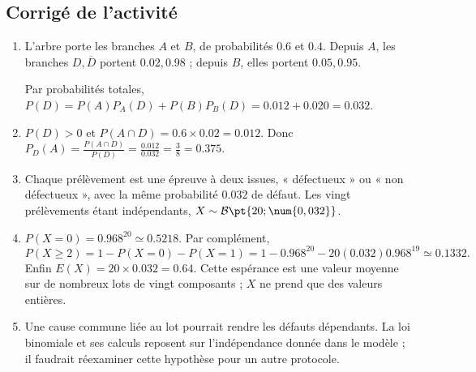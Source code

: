 \subsection{Corrigé de l'activité}\begin{enumerate}
\item L'arbre porte les branches $A$ et $B$, de probabilités $\num{0,6}$ et $\num{0,4}$. Depuis $A$, les branches $D,\overline D$ portent $\num{0,02},\num{0,98}$ ; depuis $B$, elles portent $\num{0,05},\num{0,95}$.
\begin{center}\end{center}
Par probabilités totales, $P(D)=P(A)P_A(D)+P(B)P_B(D)=\num{0,012}+\num{0,020}=\num{0,032}$.
\item $P(D)>0$ et $P(A\cap D)=\num{0,6}\times\num{0,02}=\num{0,012}$. Donc $P_D(A)=\frac{P(A\cap D)}{P(D)}=\frac{\num{0,012}}{\num{0,032}}=\frac{3}{8}=\num{0,375}$.
\item Chaque prélèvement est une épreuve à deux issues, « défectueux » ou « non défectueux », avec la même probabilité $\num{0,032}$ de défaut. Les vingt prélèvements étant indépendants, $X\sim\mathcal B\pt{20;\num{0,032}}$.
\item $P(X=0)=\num{0,968}^{20}\simeq\num{0,5218}$. Par complément,
\[P(X\ge2)=1-P(X=0)-P(X=1)=1-\num{0,968}^{20}-20(\num{0,032})\num{0,968}^{19}\simeq\num{0,1332}.\]
Enfin $E(X)=20\times\num{0,032}=\num{0,64}$. Cette espérance est une valeur moyenne sur de nombreux lots de vingt composants ; $X$ ne prend que des valeurs entières.
\item Une cause commune liée au lot pourrait rendre les défauts dépendants. La loi binomiale et ses calculs reposent sur l'indépendance donnée dans le modèle ; il faudrait réexaminer cette hypothèse pour un autre protocole.
\end{enumerate}

